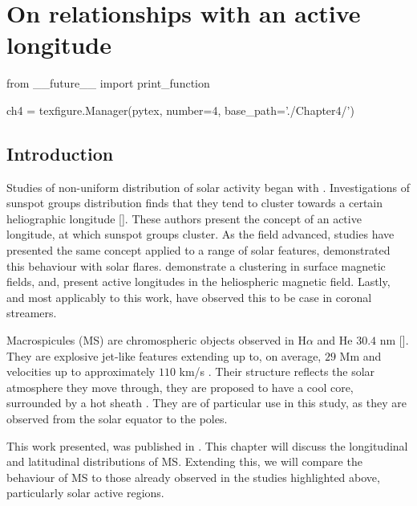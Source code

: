 \chapter{On relationships with an active longitude}
\label{ch:4}  %

\begin{pycode}[chapter4]
from __future__ import print_function

ch4 = texfigure.Manager(pytex, number=4, base_path='./Chapter4/')
\end{pycode}

\section{Introduction}
Studies of non-uniform distribution of solar activity began with \cite{Chidambara1932}.
Investigations of sunspot groups distribution finds that they tend to cluster towards a certain heliographic longitude [\cite{Bumba1965,Balthasar1984,Wilkinson1991}].
These authors present the concept of an active longitude, at which sunspot groups cluster.
As the field advanced, studies have presented the same concept applied to a range of solar features, \cite{Zhang2007} demonstrated this behaviour with solar flares.
\cite{Benevolenskaya1999} demonstrate a clustering in surface magnetic fields, and, \cite{Mursula2004} present active longitudes in the heliospheric magnetic field.
Lastly, and most applicably to this work, \cite{Jing2011} have observed this to be case in coronal streamers.

Macrospicules (MS) are chromospheric objects observed in H$\alpha$ and He $30.4$ nm [\cite{Bohlin1975,Wang1998,Murawski2011,Scullion2010}]. 
They are explosive jet-like features extending up to, on average, $29$ Mm and velocities up to approximately $110$ km/s \cite{Zaqara_Erdelyi2009}. 
Their structure reflects the solar atmosphere they move through, they are proposed to have a cool core, surrounded by a hot sheath \cite{Parenti2002}. 
They are of particular use in this study, as they are observed from the solar equator to the poles. 

This work presented, was published in \cite{Gyenge2015}.
This chapter will discuss the longitudinal and latitudinal distributions of MS.
Extending this, we will compare the behaviour of MS to those already observed in the studies highlighted above, particularly solar active regions.

